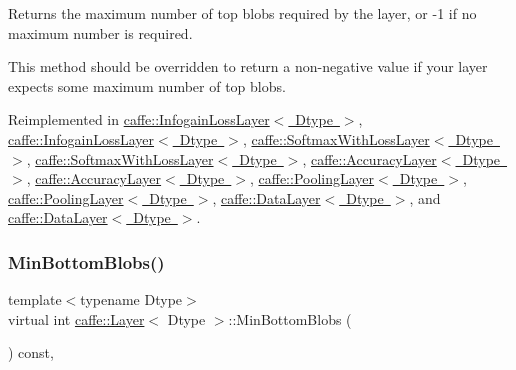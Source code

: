 Returns the maximum number of top blobs required by the layer, or -\/1 if no maximum number is required. 

This method should be overridden to return a non-\/negative value if your layer expects some maximum number of top blobs. 

Reimplemented in \mbox{\hyperlink{classcaffe_1_1_infogain_loss_layer_a93019601c6256354fd4758da91d9311f}{caffe\+::\+Infogain\+Loss\+Layer$<$ Dtype $>$}}, \mbox{\hyperlink{classcaffe_1_1_infogain_loss_layer_a93019601c6256354fd4758da91d9311f}{caffe\+::\+Infogain\+Loss\+Layer$<$ Dtype $>$}}, \mbox{\hyperlink{classcaffe_1_1_softmax_with_loss_layer_a5a0b4c02fe76ae9087cd8b1b9edd9910}{caffe\+::\+Softmax\+With\+Loss\+Layer$<$ Dtype $>$}}, \mbox{\hyperlink{classcaffe_1_1_softmax_with_loss_layer_a5a0b4c02fe76ae9087cd8b1b9edd9910}{caffe\+::\+Softmax\+With\+Loss\+Layer$<$ Dtype $>$}}, \mbox{\hyperlink{classcaffe_1_1_accuracy_layer_a7591ae6d50dd7d96b91241b5b0368997}{caffe\+::\+Accuracy\+Layer$<$ Dtype $>$}}, \mbox{\hyperlink{classcaffe_1_1_accuracy_layer_a7591ae6d50dd7d96b91241b5b0368997}{caffe\+::\+Accuracy\+Layer$<$ Dtype $>$}}, \mbox{\hyperlink{classcaffe_1_1_pooling_layer_a76539d04ef7252c12e932ea703f8246b}{caffe\+::\+Pooling\+Layer$<$ Dtype $>$}}, \mbox{\hyperlink{classcaffe_1_1_pooling_layer_a76539d04ef7252c12e932ea703f8246b}{caffe\+::\+Pooling\+Layer$<$ Dtype $>$}}, \mbox{\hyperlink{classcaffe_1_1_data_layer_ac47e9f3bff3db9d7364f6c392427745c}{caffe\+::\+Data\+Layer$<$ Dtype $>$}}, and \mbox{\hyperlink{classcaffe_1_1_data_layer_ac47e9f3bff3db9d7364f6c392427745c}{caffe\+::\+Data\+Layer$<$ Dtype $>$}}.

\mbox{\label{classcaffe_1_1_layer_aca3cb2bafaefda5d4760aaebd0b72def}} 
\subsubsection{\texorpdfstring{Min\+Bottom\+Blobs()}{MinBottomBlobs()}\hspace{0.1cm}{\footnotesize\ttfamily [1/2]}}
{\footnotesize\ttfamily template$<$typename Dtype$>$ \\
virtual int \mbox{\hyperlink{classcaffe_1_1_layer}{caffe\+::\+Layer}}$<$ Dtype $>$\+::Min\+Bottom\+Blobs (\begin{DoxyParamCaption}{ }\end{DoxyParamCaption}) const\hspace{0.3cm}{\ttfamily [inline]}, {\ttfamily [virtual]}}



